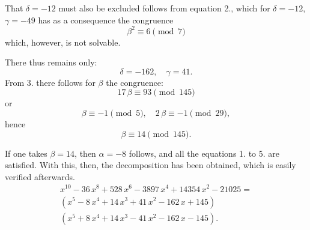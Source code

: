 That $\delta = -12$ must also be excluded follows from equation 2., which for $\delta = -12$, $\gamma = -49$ has as a consequence the congruence
\[
\beta^2 \equiv 6 \pmod{7}
\]
which, however, is not solvable.

There thus remains only:
\[
\delta = -162,\quad \gamma = 41.
\]
From 3. there follows for $\beta$ the congruence:
\[
17\,\beta \equiv 93 \pmod{145}
\]
or
\[
\beta \equiv -1 \pmod{5},\quad 2\,\beta \equiv -1 \pmod{29},
\]
hence
\[
\beta \equiv 14 \pmod{145}.
\]

If one takes $\beta = 14$, then $\alpha = -8$ follows, and all the equations 1. to 5. are satisfied. With this, then, the decomposition has been obtained, which is easily verified afterwards.
\[
\begin{aligned}
x^{10} - 36\,x^8 + 528\,x^6 - 3897\,x^4 + 14354\,x^2 - 21025 = \\
(x^5 - 8\,x^4 + 14\,x^3 + 41\,x^2 - 162\,x + 145)\\
(x^5 + 8\,x^4 + 14\,x^3 - 41\,x^2 - 162\,x - 145).
\end{aligned}
\]
